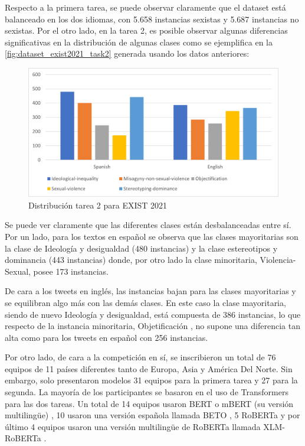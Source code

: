 Respecto a la primera tarea, se puede observar claramente que el dataset está balanceado en los dos idiomas, con 5.658 instancias sexistas y 5.687 instancias no sexistas. Por el otro lado, en la tarea 2, es posible observar algunas diferencias significativas en la distribución de algunas clases como se ejemplifica en la \autoref{fig:dataset_exist2021_task2} generada usando los datos anteriores:

\begin{figure}[H]
    \centering
    \includegraphics[width=16cm]{imagenes/Arte/task2_exist2021.png}
    \caption{\centering Distribución tarea 2 para EXIST 2021}
    \label{fig:dataset_exist2021_task2}  
\end{figure}

Se puede ver claramente que las diferentes clases están desbalanceadas entre sí. Por un lado, para los textos en español se observa que las clases mayoritarias son la clase de Ideología y desigualdad (480 instancias) y la clase estereotipos y dominancia (443 instancias) donde, por otro lado la clase minoritaria, Violencia-Sexual, posee 173 instancias.

De cara a los tweets en inglés, las instancias bajan para las clases mayoritarias y se equilibran algo más con las demás clases. En este caso la clase mayoritaria, siendo de nuevo Ideología y desigualdad, está compuesta de 386 instancias, lo que respecto de la instancia minoritaria, Objetificación , no supone una diferencia tan alta como para los tweets en español con 256 instancias.

Por otro lado, de cara a la competición en sí, se inscribieron un total de 76 equipos de 11 países diferentes tanto de Europa, Asia y América Del Norte. Sin embargo, solo presentaron modelos 31 equipos para la primera tarea y 27 para la segunda. La mayoría de los participantes se basaron en el uso de Transformers para las dos tareas. Un total de 14 equipos usaron BERT \cite{devlin2018bert} o mBERT (su versión multilingüe) \cite{pires2019multilingual}, 10 usaron una versión española llamada BETO \cite{de2021applying}, 5 RoBERTa \cite{liu2019roberta} y por último 4 equipos usaron una versión multilingüe de RoBERTa llamada XLM-RoBERTa \cite{lample2019cross}.

